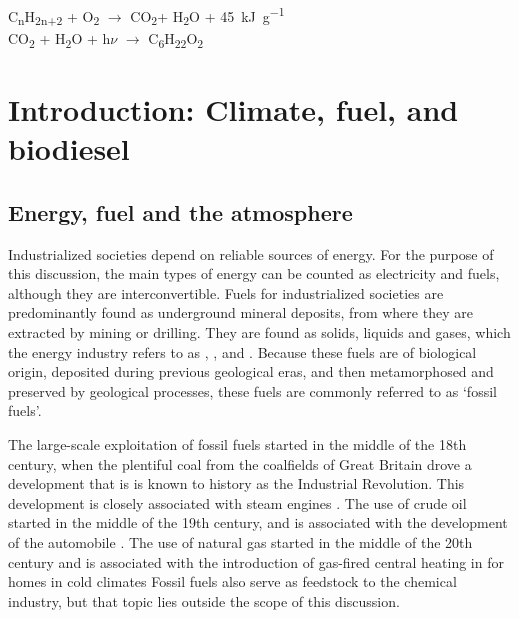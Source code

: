 \begin{savequote}[\quotewidth]
C\textsubscript{n}H\textsubscript{2n+2} + O\textsubscript{2} $\rightarrow$ CO\textsubscript{2}+ H\textsubscript{2}O + \SI{45}{\kilo\joule\per\gram}\\
CO\textsubscript{2} + H\textsubscript{2}O + h$\nu$ $\rightarrow$ C\textsubscript{6}H\textsubscript{22}O\textsubscript{2} 
\end{savequote}

\chapter{Introduction: Climate, fuel, and biodiesel} %

\label{Chapter1} %


\section{Energy, fuel and the atmosphere}

Industrialized societies depend on reliable sources of energy. For the purpose
of this discussion, the main types of energy can be counted as electricity and
fuels, although they are interconvertible. Fuels for industrialized societies
are predominantly found as underground mineral deposits, from where they are
extracted by mining or drilling. They are found as solids, liquids and gases,
which the energy industry refers to as , , and
. Because these fuels are of biological origin, deposited
during previous geological eras, and then metamorphosed and preserved by
geological processes, these fuels are commonly referred to as `fossil fuels'.

The large-scale exploitation of fossil fuels started in the middle of the 18th
century, when the plentiful coal from the coalfields of Great Britain drove a
development that is is known to history as the Industrial Revolution. This
development is closely associated with steam engines \autocite{Rosen2012}. The
use of crude oil started in the middle of the 19th century, and is associated
with the development of the automobile \autocite[p. 42]{Watts2005}. The use of
natural gas started in the middle of the 20th century and is associated with the
introduction of gas-fired central heating in for homes in cold climates
\autocite{Hanmer2017} Fossil fuels also serve as feedstock to the chemical
industry, but that topic lies outside the scope of this discussion.

